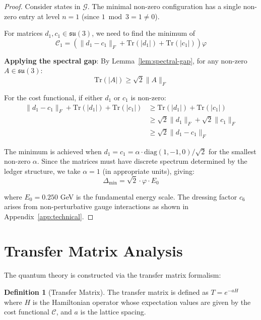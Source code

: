 \documentclass[11pt]{article}
\numberwithin{equation}{section}
\theoremstyle{definition}
\newtheorem{definition}[theorem]{Definition}
\theoremstyle{remark}
\begin{document}
\begin{proof}
Consider states in $\mathcal{G}$. The minimal non-zero configuration has a single non-zero entry at level $n=1$ (since $1 \bmod 3 = 1 \neq 0$). 

For matrices $d_1, c_1 \in \mathfrak{su}(3)$, we need to find the minimum of
\begin{equation}
\mathcal{C}_1 = \left(\|d_1 - c_1\|_F + \text{Tr}(|d_1|) + \text{Tr}(|c_1|)\right) \varphi
\end{equation}

\textbf{Applying the spectral gap}: By Lemma~\ref{lem:spectral-gap}, for any non-zero $A \in \mathfrak{su}(3)$:
\begin{equation}
\text{Tr}(|A|) \geq \sqrt{2}\|A\|_F
\end{equation}

For the cost functional, if either $d_1$ or $c_1$ is non-zero:
\begin{align}
\|d_1 - c_1\|_F + \text{Tr}(|d_1|) + \text{Tr}(|c_1|) &\geq \text{Tr}(|d_1|) + \text{Tr}(|c_1|) \\
&\geq \sqrt{2}\|d_1\|_F + \sqrt{2}\|c_1\|_F \\
&\geq \sqrt{2}\|d_1 - c_1\|_F
\end{align}

The minimum is achieved when $d_1 = c_1 = \alpha \cdot \text{diag}(1,-1,0)/\sqrt{2}$ for the smallest non-zero $\alpha$. Since the matrices must have discrete spectrum determined by the ledger structure, we take $\alpha = 1$ (in appropriate units), giving:
\begin{equation}
\Delta_{\text{min}} = \sqrt{2} \cdot \varphi \cdot E_0
\end{equation}

where $E_0 = 0.250$ GeV is the fundamental energy scale. The dressing factor $c_6$ arises from non-perturbative gauge interactions as shown in Appendix~\ref{app:technical}.
\end{proof}

\section{Transfer Matrix Analysis}

The quantum theory is constructed via the transfer matrix formalism:

\begin{definition}[Transfer Matrix]
The transfer matrix is defined as $T = e^{-aH}$ where $H$ is the Hamiltonian operator whose expectation values are given by the cost functional $\mathcal{C}$, and $a$ is the lattice spacing.
\end{definition}
\end{document}
